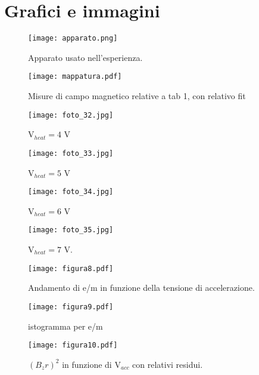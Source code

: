 \section{Grafici e immagini}

\begin{figure}[h]
	\centering
	\texttt{[image: apparato.png]}
	\caption{Apparato usato nell'esperienza.}
	\label{f:apparato}
\end{figure}
\begin{figure}[h]
	\centering
	\texttt{[image: mappatura.pdf]}
	\caption{Misure di campo magnetico relative a tab 1, con relativo fit }
	\label{f:mappatura}
\end{figure}
\begin{figure}[h]
	\centering
	\texttt{[image: foto\_32.jpg]}
	\caption{V$_{heat} = 4$ V}
	\label{f:figura_3}
\end{figure}
\begin{figure}[h]
	\centering
	\texttt{[image: foto\_33.jpg]}
	\caption{V$_{heat} = 5$ V}
           \label{f:figura_4}
\end{figure}
\begin{figure}[h]
	\centering
	\texttt{[image: foto\_34.jpg]}
	\caption{V$_{heat} = 6$ V}
	\label{f:figura_5}
\end{figure}
\begin{figure}[h]
	\centering
	\texttt{[image: foto\_35.jpg]}
	\caption{V$_{heat} = 7$ V.}
           \label{f:figura_6}
\end{figure}

\begin{figure}[h]
	\centering
	\texttt{[image: figura8.pdf]}
	\caption{Andamento di e/m in funzione della tensione di accelerazione.}
	\label{f:figura_8}
\end{figure}
\begin{figure}[h]
	\centering
	\texttt{[image: figura9.pdf]}
	\caption{istogramma per e/m}
           \label{f:figura_9}
\end{figure}
\begin{figure}[h]
	\centering
	\texttt{[image: figura10.pdf]}
	\caption{${(B_z r)}^2$ in funzione di V$_{acc}$ con relativi residui.}
           \label{f:figura_10}
\end{figure}